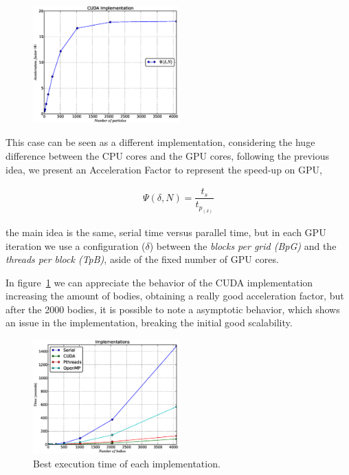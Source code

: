 \begin{figure}[h!t]
    \centering
    \includegraphics[width=0.5\textwidth]{images/cuda.eps}
    \label{fig:cuda}
\end{figure}

This case can be seen as a different implementation,
considering the huge difference between the CPU cores and the GPU cores,
following the previous idea, we present an Acceleration Factor to represent the speed-up on GPU,

\begin{eqnarray}
    \Psi(\delta,N) = \dfrac{t_{s}}{t_{p_{(\delta)}}} 
\end{eqnarray}

the main idea is the same, serial time versus parallel time,
but in each GPU iteration we use a configuration ($\delta$) between the
\emph{blocks per grid (BpG)} and the \emph{threads per block (TpB)},
aside of the fixed number of GPU cores.

In figure~\ref{fig:cuda} we can appreciate
the behavior of the CUDA implementation increasing the amount of bodies,
obtaining a really good acceleration factor,
but after the 2000 bodies, it is possible to note
a asymptotic behavior, which shows an issue in the implementation,
breaking the initial good scalability.

\begin{figure}[h!t]
    \centering
    \includegraphics[width=0.5\textwidth]{images/all.eps}
    \caption{Best execution time of each implementation.}
    \label{fig:all}
\end{figure}

